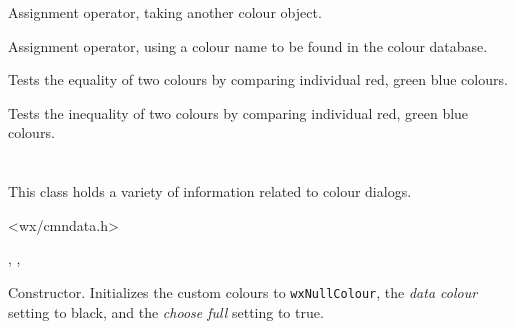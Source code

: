 
Assignment operator, taking another colour object.


Assignment operator, using a colour name to be found in the colour database.




\label{wxcolourequality}


Tests the equality of two colours by comparing individual red, green blue colours.


\label{wxcolourinequality}


Tests the inequality of two colours by comparing individual red, green blue colours.

\section{}\label{wxcolourdata}

This class holds a variety of information related to colour dialogs.




<wx/cmndata.h>


, , 



\label{wxcolourdatactor}


Constructor. Initializes the custom colours to {\tt wxNullColour},
the {\it data colour} setting
to black, and the {\it choose full} setting to true.


\label{wxcolourdatadtor}


